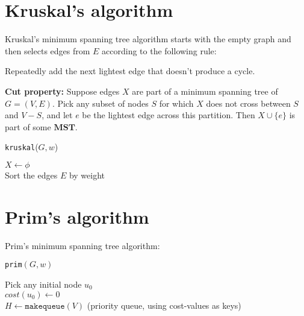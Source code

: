 \documentclass[11pt]{article}
\begin{document}
	\section*{Kruskal's algorithm}
	Kruskal’s minimum spanning tree algorithm starts with the empty graph and then selects edges from $E$ according to the following rule:
	\begin{center}
		Repeatedly add the next lightest edge that doesn’t produce a cycle.
	\end{center}
	\textbf{Cut property:}  Suppose edges $X$ are part of a minimum spanning tree of $G = (V, E)$. Pick any subset of nodes $S$ for which $X$ does not cross between $S$ and $V - S$, and let $e$ be the lightest edge across this partition. Then $X \cup \{e\}$ is part of some $\mathbf{MST}$.\\
	\begin{algorithm}[H]
		\caption{\texttt{kruskal}($G, w$)}
		
		$X \leftarrow \phi$ \\
		Sort the edges $E$ by weight \\
	\end{algorithm}

	\section*{Prim's algorithm}
	Prim’s minimum spanning tree algorithm:\\
	\begin{algorithm}[H]
		\caption{\texttt{prim}$(G, w)$}
		
		Pick any initial node $u_0$\\
		$cost(u_0) \leftarrow 0$\\
		$H \leftarrow \texttt{makequeue}(V)$ (priority queue, using cost-values as keys)\\
	\end{algorithm}
	
\end{document}

